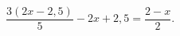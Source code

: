 \begin{ex}[type=equation]
	\begin{condition}
		$\dfrac{3(2x - 2,5)}{5} - 2x + 2,5 = \dfrac{2 - x}{2}.$
	\end{condition}
\end{ex}